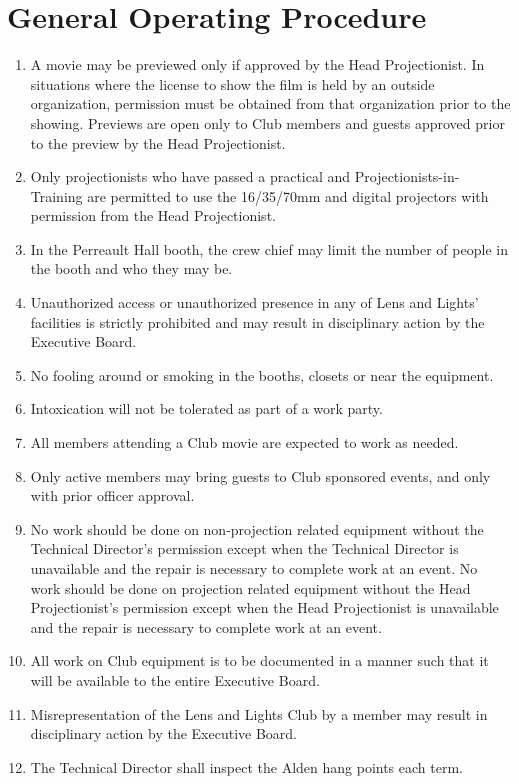 \documentclass[12pt,letterpaper,oneside]{book}
\begin{document}
\section{General Operating Procedure}

\begin{enumerate}

\item A movie may be previewed only if approved by the Head Projectionist. In situations where the license to show the film is held by an outside organization, permission must be obtained from that organization prior to the showing. Previews are open only to Club members and guests approved prior to the preview by the Head Projectionist.
\item Only projectionists who have passed a practical and Projectionists-in-Training are permitted to use the 16/35/70mm and digital projectors with permission from the Head Projectionist.
\item In the Perreault Hall booth, the crew chief may limit the number of people in the booth and who they may be.
\item Unauthorized access or unauthorized presence in any of Lens and Lights' facilities is strictly prohibited and may result in disciplinary action by the Executive Board.
\item No fooling around or smoking in the booths, closets or near the equipment.
\item Intoxication will not be tolerated as part of a work party.
\item All members attending a Club movie are expected to work as needed.
\item Only active members may bring guests to Club sponsored events, and only with prior officer approval.
\item No work should be done on non-projection related equipment without the Technical Director's permission except when the Technical Director is unavailable and the repair is necessary to complete work at an event. No work should be done on projection related equipment without the Head Projectionist's permission except when the Head Projectionist is unavailable and the repair is necessary to complete work at an event.
\item All work on Club equipment is to be documented in a manner such that it will be available to the entire Executive Board.
\item Misrepresentation of the Lens and Lights Club by a member may result in disciplinary action by the Executive Board.
\item The Technical Director shall inspect the Alden hang points each term.

\end{enumerate}
\end{document}
